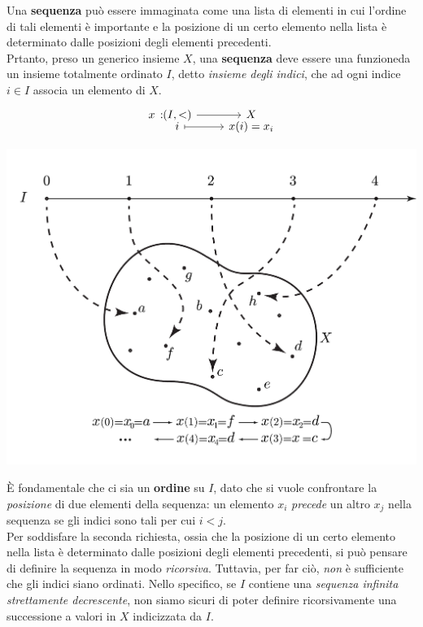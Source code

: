 Una \textbf{sequenza} può essere immaginata come una lista di elementi in cui l'ordine di tali elementi è importante e la posizione di un certo elemento nella lista è determinato dalle posizioni degli elementi precedenti.\\
Prtanto, preso un generico insieme $X$, una \textbf{sequenza} deve essere una funzioneda un insieme totalmente ordinato $I$, detto \textit{insieme degli indici}, che ad ogni indice $i\in I$ associa un elemento di $X$.
\begin{equation*}
	\funztot{x}{\left(I,<\right)}{X}{i}{x(i)=x_i}
\end{equation*}
\begin{center}
		\includegraphics[trim=0cm 0cm 0cm 0cm, clip, scale=0.5]{images/settheorygrafico1.pdf}
\end{center}
È fondamentale che ci sia un \textbf{ordine} su $I$, dato che si vuole confrontare la \textit{posizione} di due elementi della sequenza: un elemento $x_i$ \textit{precede} un altro $x_j$ nella sequenza se gli indici sono tali per cui $i<j$.\\
Per soddisfare la seconda richiesta, ossia che la posizione di un certo elemento nella lista è determinato dalle posizioni degli elementi precedenti, si può pensare di definire la sequenza in modo \textit{ricorsiva}.
Tuttavia, per far ciò, \textit{non} è sufficiente che gli indici siano ordinati. Nello specifico, se $I$ contiene una \textit{sequenza infinita strettamente decrescente}, non siamo sicuri di poter definire ricorsivamente una successione a valori in $X$ indicizzata da $I$.\\
